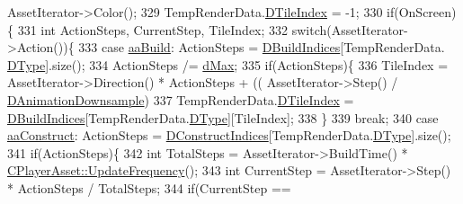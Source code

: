 \begin{DoxyCode}
{      AssetIterator->Color();
329             TempRenderData.\hyperlink{structSAssetRenderData_a8c97c7f34d5b359f6fa23ce215a09929}{DTileIndex} = -1;
330             \textcolor{keywordflow}{if}(OnScreen)\{
331                 \textcolor{keywordtype}{int} ActionSteps, CurrentStep, TileIndex;
332                 \textcolor{keywordflow}{switch}(AssetIterator->Action())\{
333                     \textcolor{keywordflow}{case} \hyperlink{GameDataTypes_8h_ab47668e651a3032cfb9c40ea2d60d670a02b95b7163284c6e80c9008073d8480d}{aaBuild}:           ActionSteps = \hyperlink{classCAssetRenderer_aa892b01d11bef2aca7491461eb97dffb}{DBuildIndices}[TempRenderData.
      \hyperlink{structSAssetRenderData_ae986cfe9d4238fa31fb511b40392d97f}{DType}].size();
334                                             ActionSteps /= \hyperlink{GameDataTypes_8h_acb2b033915f6659a71a38b5aa6e4eb42af6546049275557ce0ade2ceee042a319}{dMax};
335                                             \textcolor{keywordflow}{if}(ActionSteps)\{
336                                                 TileIndex = AssetIterator->Direction() * ActionSteps + ((
      AssetIterator->Step() / \hyperlink{classCAssetRenderer_a13ea9a19837c39e57db499f53366c5b8}{DAnimationDownsample})%
337                                                 TempRenderData.\hyperlink{structSAssetRenderData_a8c97c7f34d5b359f6fa23ce215a09929}{DTileIndex} = 
      \hyperlink{classCAssetRenderer_aa892b01d11bef2aca7491461eb97dffb}{DBuildIndices}[TempRenderData.\hyperlink{structSAssetRenderData_ae986cfe9d4238fa31fb511b40392d97f}{DType}][TileIndex];
338                                             \}
339                                             \textcolor{keywordflow}{break};
340                     \textcolor{keywordflow}{case} \hyperlink{GameDataTypes_8h_ab47668e651a3032cfb9c40ea2d60d670a7ef6b863f66dd7dcc95a199cd758ae1d}{aaConstruct}:       ActionSteps = 
      \hyperlink{classCAssetRenderer_a1790a8f6992efbb3fea59dde42a3cacb}{DConstructIndices}[TempRenderData.\hyperlink{structSAssetRenderData_ae986cfe9d4238fa31fb511b40392d97f}{DType}].size();
341                                             \textcolor{keywordflow}{if}(ActionSteps)\{
342                                                 \textcolor{keywordtype}{int} TotalSteps = AssetIterator->BuildTime() * 
      \hyperlink{classCPlayerAsset_a0aff85b9552967a42f4f3f42cb59c19f}{CPlayerAsset::UpdateFrequency}();
343                                                 \textcolor{keywordtype}{int} CurrentStep = AssetIterator->Step() * ActionSteps / 
      TotalSteps;
344                                                 \textcolor{keywordflow}{if}(CurrentStep == 
}
\end{DoxyCode}
